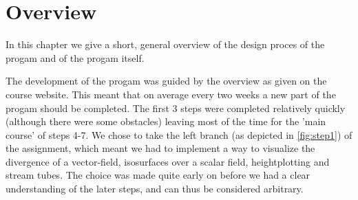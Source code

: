 \documentclass[a4paper,11pt,twoside]{report}
\begin{document}
\newcommand{\coursename}{Visualization (2IV35)}
\newcommand{\doctitle}{Practical assignment }
\newcommand{\docversion}{0.1}
\newcommand{\docdate}{\today}

\newcommand{\imagescalefactor}{0.40}
\newcommand{\cref}[1]{chapter \ref{#1}}



\dotssdocument

%

\chapter{Overview}\label{overview}
	In this chapter we give a short, general overview of the design proces of the progam and of the progam itself.

	The development of the progam was guided by the overview as given on the course website. This meant that on average every two weeks a new part of the progam should be completed. The first 3 steps were completed relatively quickly (although there were some obstacles) leaving most of the time for the 'main course' of steps 4-7. We chose to take the left branch (as depicted in \ref{fig:step1}) of the assignment, which meant we had to implement a way to visualize the divergence of a vector-field, isosurfaces over a scalar field, heightplotting and stream tubes. The choice was made quite early on before we had a clear understanding of the later steps, and can thus be considered arbitrary.
\end{document}
